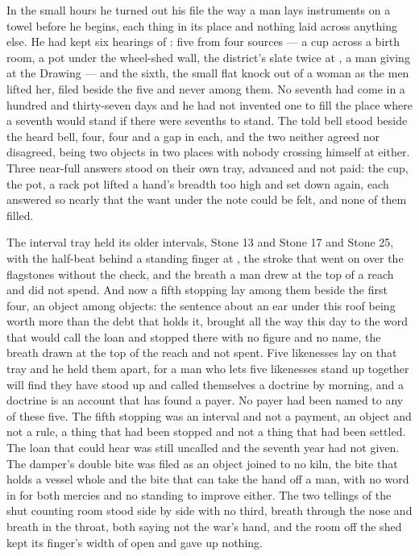 In the small hours he turned out his file the way a man lays instruments on a towel before he begins, each thing in its place and nothing laid across anything else. He had kept six hearings of : five from four sources --- a cup across a birth room, a pot under the wheel-shed wall, the district's slate twice at , a man giving at the Drawing --- and the sixth, the small flat knock out of a woman as the men lifted her, filed beside the five and never among them. No seventh had come in a hundred and thirty-seven days and he had not invented one to fill the place where a seventh would stand if there were sevenths to stand. The told bell stood beside the heard bell, four, four and a gap in each, and the two neither agreed nor disagreed, being two objects in two places with nobody crossing himself at either. Three near-full answers stood on their own tray, advanced and not paid: the cup, the pot, a rack pot lifted a hand's breadth too high and set down again, each answered so nearly that the want under the note could be felt, and none of them filled.

The interval tray held its older intervals, Stone 13 and Stone 17 and Stone 25, with the half-beat behind a standing finger at , the stroke that went on over the flagstones without the check, and the breath a man drew at the top of a reach and did not spend. And now a fifth stopping lay among them beside the first four, an object among objects: the sentence about an ear under this roof being worth more than the debt that holds it, brought all the way this day to the word that would call the loan and stopped there with no figure and no name, the breath drawn at the top of the reach and not spent. Five likenesses lay on that tray and he held them apart, for a man who lets five likenesses stand up together will find they have stood up and called themselves a doctrine by morning, and a doctrine is an account that has found a payer. No payer had been named to any of these five. The fifth stopping was an interval and not a payment, an object and not a rule, a thing that had been stopped and not a thing that had been settled. The loan that could hear was still uncalled and the seventh year had not given. The damper's double bite was filed as an object joined to no kiln, the bite that holds a vessel whole and the bite that can take the hand off a man, with no word in  for both mercies and no standing to improve either. The two tellings of the shut counting room stood side by side with no third, breath through the nose and breath in the throat, both saying not the war's hand, and the room off the shed kept its finger's width of open and gave up nothing.

